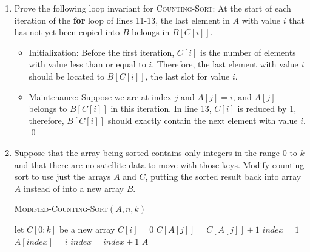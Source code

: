 \documentclass[12pt,reqno]{amsart}
\newif\ifanswer
\begin{document}
\begin{enumerate}[1.]
\item Prove the following loop invariant for \textsc{Counting-Sort}: At the start of each iteration of the \textbf{for} loop of lines 11-13, the last element in $A$ with value $i$ that has not yet been copied into $B$ belongs in $B[C[i]]$.
\vspace{0.5cm}

\ifanswer
{}

\begin{itemize}
    \item Initialization: Before the first iteration, $C[i]$ is the number of elements with value less than or equal to $i$. Therefore, the last element with value $i$ should be located to $B[C[i]]$, the last slot for value $i$.
    \item Maintenance: Suppose we are at index $j$ and $A[j] = i$, and $A[j]$ belongs to $B[C[i]]$ in this iteration. In line 13, $C[i]$ is reduced by 1, therefore, $B[C[i]]$ should exactly contain the next element with value $i$. \qed
\end{itemize}
\vspace{1cm}



\item Suppose that the array being sorted contains only integers in the range $0$ to $k$ and that there are no satellite data to move with those keys. Modify counting sort to use just the arrays $A$ and $C$, putting the sorted result back into array $A$ instead of into a new array $B$.
\vspace{0.5cm}

\ifanswer
{}

\begin{algorithm}
    \caption{\textsc{Modified-Counting-Sort}$(A, n, k)$}
    \begin{algorithmic}[1]
        \STATE let $C[0:k]$ be a new array
            \STATE $C[i] = 0$
        \ENDFOR
            \STATE $C[A[j]] = C[A[j]] + 1$
        \ENDFOR
        \STATE $index = 1$
                \STATE $A[index] = i$
                \STATE $index = index + 1$
            \ENDFOR
        \ENDFOR
        \RETURN $A$
    \end{algorithmic}
\end{algorithm}
\vspace{1cm}




\end{enumerate}
\end{document}

